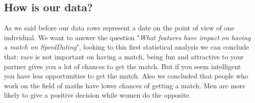 \subsection{How is our data?}
As we said before our data rows represent a date on the point of view of one individual. We want to answer the question "\textit{What features have impact on having a match on SpeedDating}", looking to this first statistical analysis we can conclude that: race is not important on having a match, being fun and attractive to your partner gives you a lot of chances to get the match. But if you seem intelligent you have less opportunities to get the match. Also we concluded that people who work on the field of maths have lower chances of getting a match. Men are more likely to give a positive decision while women do the opposite.

